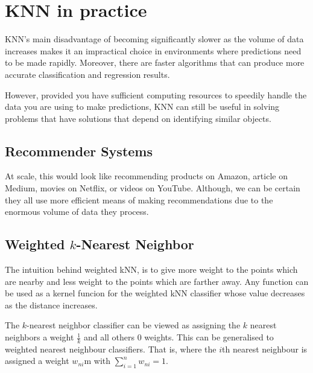 \section{KNN in practice}
KNN's main disadvantage of becoming significantly slower as the volume of data increases makes it an impractical choice in environments where predictions need to be made rapidly. Moreover, there are faster algorithms that can produce more accurate classification and regression results.

However, provided you have sufficient computing resources to speedily handle the data you are using to make predictions, KNN can still be useful in solving problems that have solutions that depend on identifying similar objects. 

\subsection{Recommender Systems}
At scale, this would look like recommending products on Amazon, article on Medium, movies on Netflix, or videos on YouTube. Although, we can be certain they all use more efficient means of making recommendations due to the enormous volume of data they process.

\subsection{Weighted \(k\)-Nearest Neighbor}
The intuition behind weighted kNN, is to give more weight to the points which are nearby and less weight to the points which are farther away. Any function can be used as a kernel funcion for the weighted kNN classifier whose value decreases as the distance increases.

The \(k\)-nearest neighbor classifier can be viewed as assigning the \(k\) nearest neighbors a weight \(\frac 1 k\) and all others \(0\) weights. This can be generalised to weighted nearest neighbour classifiers. That is, where the \(i\)th nearest neighbour is assigned a weight \(w_{ni}\)m with \(\sum_{i=1}^nw_{ni}=1\). 

